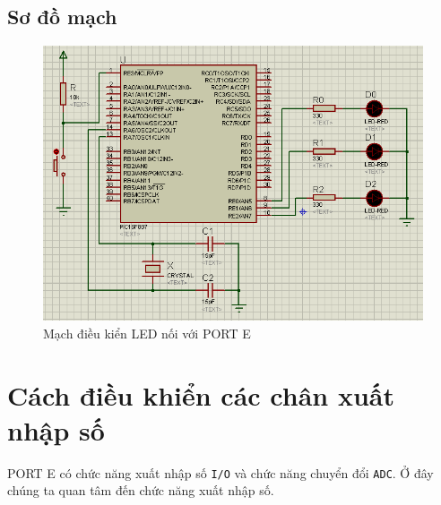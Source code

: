 \subsection{Sơ đồ mạch}
\begin{figure}[!h]
\begin{center}
\includegraphics[scale=0.7]{bai-1/image/BAI-1}
\end{center}
\caption{Mạch điều kiển LED nối với PORT E}
\end{figure}
\section{Cách điều khiển các chân xuất nhập số}
PORT E có chức năng xuất nhập số \verb|I/O| và chức năng chuyển đổi \verb|ADC|. Ở đây chúng ta quan tâm đến chức năng xuất nhập số.
